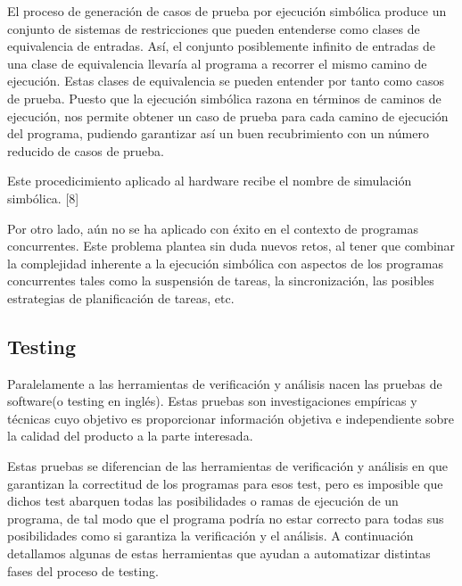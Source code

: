 El proceso de generaci\'on de casos de prueba por ejecuci\'on simb\'olica produce un conjunto de sistemas de restricciones que pueden entenderse como clases de equivalencia de entradas. As\'i, el conjunto posiblemente infinito de entradas de una clase de equivalencia llevar\'ia al programa a recorrer el mismo camino de ejecuci\'on. Estas clases de equivalencia se pueden entender por tanto como casos de prueba. Puesto que la ejecuci\'on simb\'olica razona en t\'erminos de caminos de ejecuci\'on, nos permite obtener un caso de prueba para cada camino de ejecuci\'on del programa, pudiendo garantizar as\'i un buen recubrimiento con un n\'umero reducido de casos de prueba.

Este procedicimiento aplicado al hardware recibe el nombre de simulaci\'on simb\'olica. [8]

Por otro lado, a\'un no se ha aplicado con \'exito en el contexto de programas concurrentes. Este problema plantea sin duda nuevos retos, al tener que combinar la complejidad inherente a la ejecuci\'on simb\'olica con aspectos de los programas concurrentes tales como la suspensi\'on de tareas, la sincronizaci\'on, las posibles estrategias de planificaci\'on de tareas, etc.


%

\subsection{Testing}

Paralelamente a las herramientas de verificaci\'on y an\'alisis nacen las pruebas de software(o testing en ingl\'es). Estas pruebas son investigaciones emp\'iricas y t\'ecnicas cuyo objetivo es proporcionar informaci\'on objetiva e independiente sobre la calidad del producto a la parte interesada.  

Estas pruebas se diferencian de las herramientas de verificaci\'on y an\'alisis en que garantizan la correctitud de los programas para esos test, pero es imposible que dichos test abarquen todas las posibilidades o ramas de ejecuci\'on de un programa, de tal modo que el programa podr\'ia no estar correcto para todas sus posibilidades como si garantiza la verificaci\'on y el an\'alisis. A continuaci\'on detallamos algunas de estas herramientas que ayudan a automatizar distintas fases del proceso de testing.

